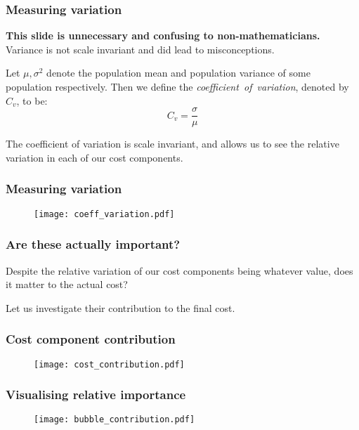 \begin{frame}
    \frametitle{Measuring variation}
    \textbf{This slide is unnecessary and confusing to non-mathematicians.}
    Variance is not scale invariant and did lead to misconceptions.

    \pause%
    \vspace{10pt}
    \begin{definition}
        Let \(\mu, \sigma^2\) denote the population mean and population variance
        of some population respectively. Then we define the
        \emph{coefficient~of~variation}, denoted by \(C_v\), to be:
        \[
            C_v = \frac{\sigma}{\mu}
        \]
    \end{definition}

    \pause%
    The coefficient of variation is scale invariant, and allows us to see the
    relative variation in each of our cost components.
\end{frame}

\begin{frame}
    \frametitle{Measuring variation}

    \begin{figure}
    \texttt{[image: coeff\_variation.pdf]}
    \end{figure}
\end{frame}

\begin{frame}
    \frametitle{Are these actually important?}

    Despite the relative variation of our cost components being whatever value,
    does it matter to the actual cost?

    \vspace{10pt}
    Let us investigate their contribution to the final cost.
\end{frame}

\begin{frame}
    \frametitle{Cost component contribution}

    \begin{figure}
    \texttt{[image: cost\_contribution.pdf]}
    \end{figure}
\end{frame}

\begin{frame}
    \frametitle{Visualising relative importance}

    \begin{figure}
    \texttt{[image: bubble\_contribution.pdf]}
    \end{figure}
\end{frame}
